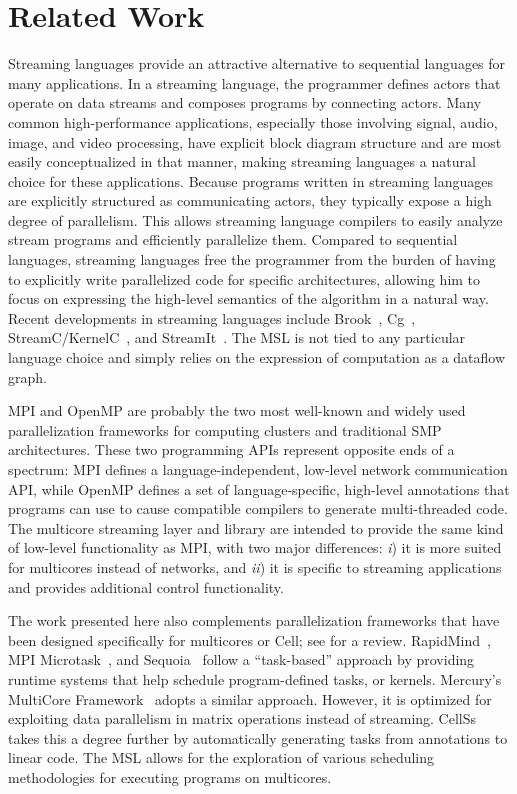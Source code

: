 \section{Related Work}\label{ch:bg}

Streaming languages provide an attractive alternative to sequential
languages for many applications. In a streaming language, the
programmer defines actors that operate on data streams and composes
programs by connecting actors. Many common high-performance
applications, especially those involving signal, audio, image, and
video processing, have explicit block diagram structure and are most
easily conceptualized in that manner, making streaming languages a
natural choice for these applications.
Because programs written in streaming languages are explicitly
structured as communicating actors, they typically expose a high
degree of parallelism. This allows streaming language compilers to
easily analyze stream programs and efficiently parallelize
them. Compared to sequential languages, streaming languages free the
programmer from the burden of having to explicitly write parallelized
code for specific architectures, allowing him to focus on expressing
the high-level semantics of the algorithm in a natural way.
Recent developments in streaming languages include Brook~\cite{brook},
Cg~\cite{cg}, StreamC/KernelC~\cite{streamc}, and StreamIt~\cite{streamitweb}.
The MSL is not tied to any particular language choice and simply
relies on the expression of computation as a dataflow graph.
 
MPI and OpenMP are probably the two most well-known and widely used
parallelization frameworks for computing clusters and traditional SMP
architectures. These two programming APIs represent opposite ends of a
spectrum: MPI defines a language-independent, low-level network
communication API, while OpenMP defines a set of language-specific,
high-level annotations that programs can use to cause compatible
compilers to generate multi-threaded code.  The multicore streaming
layer and library are intended to provide the same kind of low-level
functionality as MPI, with two major differences: \emph{i}) it is more
suited for multicores instead of networks, and \emph{ii}) it is
specific to streaming applications and provides additional control
functionality.

The work presented here also complements parallelization frameworks
that have been designed specifically for multicores or Cell; see
\cite{cell:pf} for a review. RapidMind~\cite{rapidmind}, MPI
Microtask~\cite{mpimicrotask}, and Sequoia~\cite{sequoia} follow a
``task-based'' approach by providing runtime systems that help
schedule program-defined tasks, or kernels. Mercury's MultiCore
Framework~\cite{mcf} adopts a similar approach. However, it is
optimized for exploiting data parallelism in matrix operations instead of streaming.
CellSs~\cite{cellss} takes
this a degree further by automatically generating tasks from
annotations to linear code. The MSL allows for the exploration of
various scheduling methodologies for executing programs on multicores.

